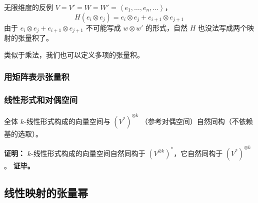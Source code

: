 

\begin{example}{无限维度的反例}
$V = V' = W = W' = \left\langle e_1, \dots, e_n, \dots \right\rangle$，
\begin{equation}
H(e_i \otimes e_j) = e_i \otimes e_j + e_{i + 1} \otimes e_{j + 1}~
\end{equation}
由于 $e_i \otimes e_j + e_{i + 1} \otimes e_{j + 1}$ 不可能写成 $w \otimes w'$ 的形式，自然 $H$ 也没法写成两个映射的张量积了。

\end{example}

类似于乘法，我们也可以定义多项的张量积。

\subsubsection{用矩阵表示张量积}



\subsubsection{线性形式和对偶空间}

\begin{theorem}{}
全体 $k$-线性形式构成的向量空间与 $(V^*)^{\otimes k}$ （参考对偶空间）自然同构（不依赖基的选取）。
\end{theorem}
\textbf{证明：} $k$-线性形式构成的向量空间自然同构于 $(V^{\otimes k})^*$，它自然同构于 $(V^*)^{\otimes k}$。
\textbf{证毕。}

\subsection{线性映射的张量幂}

